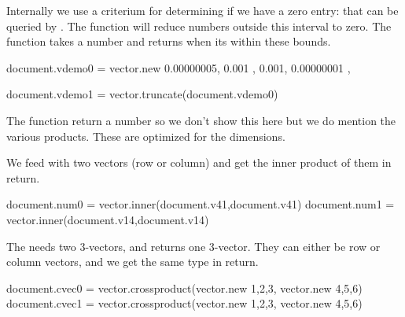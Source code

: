 \typebuffer[option=TEX] \getbuffer

\startlinecorrection
{} {}
    {} {}
    {} {}
\stopcombination
\stoplinecorrection

Internally we use a criterium for determining if we have a zero entry:
 that can be queried by . The
 function will reduce numbers outside this interval to zero. The
 function takes a number and returns  when its within
these bounds.

\startbuffer
\startluacode
document.vdemo0 = vector.new {
    { 0.00000005, 0.001 },
    { 0.001, 0.00000001 },
}

document.vdemo1 = vector.truncate(document.vdemo0)
\stopluacode
\stopbuffer

\typebuffer[option=TEX] \getbuffer

\startlinecorrection
{} {}
    {} {}
\stopcombination
\stoplinecorrection

The  function return a number so we don't show this here but
we do mention the various products. These are optimized for the dimensions.

We feed  with two vectors (row or column) and get the inner product
of them in return.

\startbuffer
\startluacode
document.num0 = vector.inner(document.v41,document.v41)
document.num1 = vector.inner(document.v14,document.v14)
\stopluacode
\stopbuffer

\typebuffer[option=TEX] \getbuffer

\startlinecorrection
{} {}
    {} {}
\stopcombination
\stoplinecorrection

The  needs two 3-vectors, and returns one 3-vector. They can
either be row or column vectors, and we get the same type in return.

\startbuffer
\startluacode
document.cvec0 = vector.crossproduct(vector.new {{1,2,3}},     vector.new {{4,5,6}})
document.cvec1 = vector.crossproduct(vector.new {{1},{2},{3}}, vector.new {{4},{5},{6}})
\stopluacode
\stopbuffer

